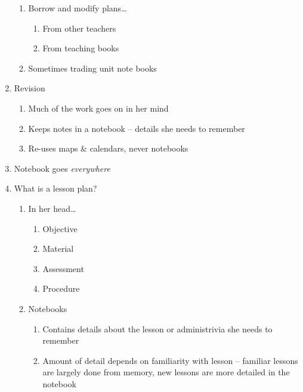 \begin{enumerate}
\begin{enumerate}
			\item Borrow and modify plans\ldots
				\begin{enumerate}
					\item From other teachers

					\item From teaching books

				\end{enumerate}

			\item Sometimes trading unit note books

		\end{enumerate}

	\item Revision
		\begin{enumerate}
			\item Much of the work goes on in her mind

			\item Keeps notes in a notebook -- details she needs to remember

			\item Re-uses maps \& calendars, never notebooks

		\end{enumerate}

	\item Notebook goes \textit{everywhere}

	\item What is a lesson plan?
		\begin{enumerate}
			\item In her head\ldots
				\begin{enumerate}
					\item Objective

					\item Material

					\item Assessment

					\item Procedure

				\end{enumerate}

			\item Notebooks
				\begin{enumerate}
					\item Contains details about the lesson or administrivia she
						needs to remember

					\item Amount of detail depends on familiarity with lesson --
						familiar lessons are largely done from memory, new
						lessons are more detailed in the notebook

				\end{enumerate}

		\end{enumerate}

\end{enumerate}


